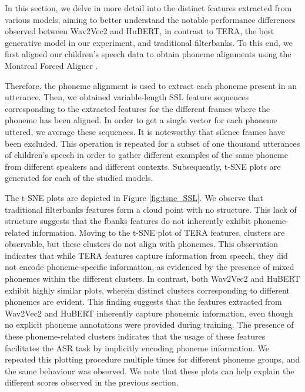 In this section, we delve in more detail into the distinct features extracted from various models, aiming to better understand the notable performance differences observed between Wav2Vec2 and HuBERT, in contrast to TERA, the best generative model in our experiment, and traditional filterbanks. To this end, we first aligned our children's speech data to obtain phoneme alignments using the Montreal Forced Aligner \cite{mcauliffe2017montreal}. %

Therefore, the phoneme alignment is used to extract each phoneme present in an utterance. Then, we obtained variable-length \ac{SSL} feature sequences corresponding to the extracted features for the different frames where the phoneme has been aligned. In order to get a single vector for each phoneme uttered, we average these sequences. It is noteworthy that silence frames have been excluded. This operation is repeated for a subset of one thousand utterances of children's speech in order to gather different examples of the same phoneme from different speakers and different contexts. Subsequently, \ac{t-SNE} plots are generated for each of the studied models. 

The \ac{t-SNE} plots are depicted in Figure \ref{fig:tsne_SSL}. We observe that traditional filterbanks features form a cloud point with no structure. This lack of structure suggests that the \ac{fbanks} features do not inherently exhibit phoneme-related information.
Moving to the \ac{t-SNE} plot of TERA features, clusters are observable, but these clusters do not align with phonemes. This observation indicates that while TERA features capture information from speech, they did not encode phoneme-specific information, as evidenced by the presence of mixed phonemes within the different clusters.
In contrast, both Wav2Vec2 and HuBERT exhibit highly similar plots, wherein distinct clusters corresponding to different phonemes are evident. This finding suggests that the features extracted from Wav2Vec2 and HuBERT inherently capture phonemic information, even though no explicit phoneme annotations were provided during training. The presence of these phoneme-related clusters indicates that the usage of these features facilitates the \ac{ASR} task by implicitly encoding phoneme information. We repeated this plotting procedure multiple times for different phoneme groups, and the same behaviour was observed. We note that these plots can help explain the different scores observed in the previous section.


